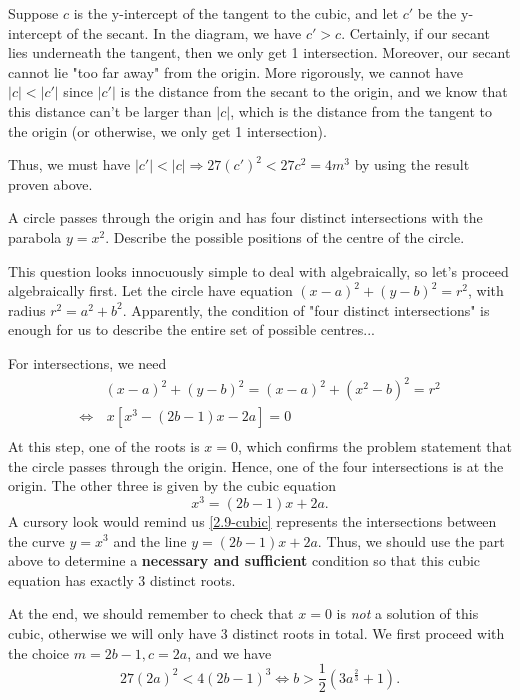 \documentclass[../main.tex]{subfiles}
\begin{document}
Suppose $c$ is the y-intercept of the tangent to the cubic, and let $c'$ be the y-intercept of the secant. In the diagram, we have $c' > c$. Certainly, if our secant lies underneath the tangent, then we only get 1 intersection. Moreover, our secant cannot lie "too far away" from the origin. More rigorously, we cannot have $|c|<|c'|$ since $|c'|$ is the distance from the secant to the origin, and we know that this distance can't be larger than $|c|$, which is the distance from the tangent to the origin (or otherwise, we only get 1 intersection).

Thus, we must have $|c'|<|c| \Longrightarrow 27(c')^2 < 27c^2 = 4m^3$ by using the result proven above.

\begin{example}[cont..]
A circle passes through the origin and has four distinct intersections with the parabola $y=x^2$. Describe the possible positions of the centre of the circle.
\end{example}
This question looks innocuously simple to deal with algebraically, so let's proceed algebraically first. Let the circle have equation $(x-a)^2+(y-b)^2=r^2$, with radius $r^2=a^2+b^2$. Apparently, the condition of "four distinct intersections" is enough for us to describe the entire set of possible centres...

For intersections, we need
\begin{align*}
    &(x-a)^2+(y-b)^2 =(x-a)^2+(x^2-b)^2=r^2 \\
    \Longleftrightarrow& \,x\left[x^3-(2b-1)x-2a\right]=0\\
\end{align*}
At this step, one of the roots is $x=0$, which confirms the problem statement that the circle passes through the origin. Hence, one of the four intersections is at the origin. The other three is given by the cubic equation 
\begin{equation}\label{2.9-cubic}
    x^3=(2b-1)x+2a.
\end{equation} A cursory look would remind us \eqref{2.9-cubic} represents the intersections between the curve $y=x^3$ and the line $y=(2b-1)x+2a$. Thus, we should use the part above to determine a \textbf{necessary and sufficient} condition so that this cubic equation has exactly 3 distinct roots.

At the end, we should remember to check that $x=0$ is \textit{not} a solution of this cubic, otherwise we will only have 3 distinct roots in total. We first proceed with the choice $m=2b-1, c=2a$, and we have $$27(2a)^2 < 4(2b-1)^3 \Longleftrightarrow b > \frac{1}{2}\left(3a^{\frac{2}{3}}+1\right).$$
\end{document}
